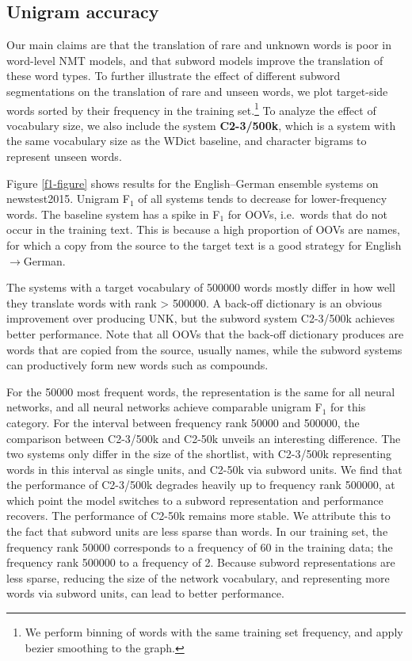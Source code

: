 \documentclass[11pt]{article}
\begin{document}
\subsection{Unigram accuracy}

Our main claims are that the translation of rare and unknown words is poor in word-level NMT models, and that subword models improve the translation of these word types.
To further illustrate the effect of different subword segmentations on the translation of rare and unseen words, we plot target-side words sorted by their frequency in the training set.\footnote{We perform binning of words with the same training set frequency, and apply bezier smoothing to the graph.}
To analyze the effect of vocabulary size, we also include the system \textbf{C2-3/500k}, which is a system with the same vocabulary size as the WDict baseline, and character bigrams to represent unseen words.

Figure \ref{f1-figure} shows results for the English--German ensemble systems on newstest2015.
Unigram F$_1$ of all systems tends to decrease for lower-frequency words.
The baseline system has a spike in F$_1$ for OOVs, i.e.\ words that do not occur in the training text.
This is because a high proportion of OOVs are names, for which a copy from the source to the target text is a good strategy for English$\to$German.

The systems with a target vocabulary of \num{500000} words mostly differ in how well they translate words with rank > \num{500000}.
A back-off dictionary is an obvious improvement over producing UNK, but the subword system C2-3/500k achieves better performance.
Note that all OOVs that the back-off dictionary produces are words that are copied from the source, usually names, while the subword systems can productively form new words such as compounds.

For the \num{50000} most frequent words, the representation is the same for all neural networks, and all neural networks achieve comparable unigram F$_1$ for this category.
For the interval between frequency rank \num{50000} and \num{500000}, the comparison between C2-3/500k and C2-50k unveils an interesting difference.
The two systems only differ in the size of the shortlist, with C2-3/500k representing words in this interval as single units, and C2-50k via subword units.
We find that the performance of C2-3/500k degrades heavily up to frequency rank \num{500000}, at which point the model switches to a subword representation and performance recovers.
The performance of C2-50k remains more stable.
We attribute this to the fact that subword units are less sparse than words.
In our training set, the frequency rank \num{50000} corresponds to a frequency of 60 in the training data; the frequency rank \num{500000} to a frequency of 2.
Because subword representations are less sparse, reducing the size of the network vocabulary, and representing more words via subword units, can lead to better performance.
\end{document}
